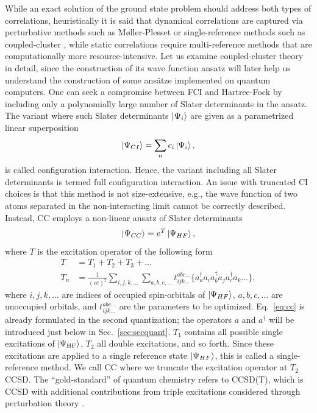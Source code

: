 \documentclass[../main.tex]{subfiles}
\begin{document}
While an exact solution of the ground state problem should address both types of correlations, heuristically it is said that dynamical correlations are captured via perturbative methods such as Møller-Plesset \cite{moller1934note} or single-reference methods such as coupled-cluster \cite{cizek1966on}, while static correlations require multi-reference methods that are computationally more resource-intensive. Let us examine coupled-cluster theory in detail, since the construction of its wave function ansatz will later help us understand the construction of some ansätze implemented on quantum computers. 
One can seek a compromise between FCI and Hartree-Fock by including only a polynomially large number of Slater determinants in the ansatz. The variant where such Slater determinants $\ket{\Psi_i}$ are given as a parametrized linear superposition
\begin{equation}
    \ket{\Psi_{CI}} = \sum_n c_i \ket{\Psi_i},
\end{equation} is called configuration interaction. Hence, the variant including all Slater determinants is termed full configuration interaction. An issue with truncated CI choices is that this method is not size-extensive, e.g., the wave function of two atoms separated in the non-interacting limit cannot be correctly described. Instead, \ac{CC} employs a non-linear ansatz of Slater determinants
\begin{equation}
    \ket{\Psi_{CC}} = e^T \ket{\Psi_{HF}},
\end{equation} where $T$  is the excitation operator of the following form \cite{taube2006new}
\begin{align}\label{eq:cc}
    T &= T_1 + T_2 + T_3 + \dots \\
    T_n &= \frac{1}{(n!)^2} \sum_{i,j,k,\dots}\sum_{a,b,c,\dots} t^{abc\dots}_{ijk\dots} \{a_a^\dagger a_i a_b^\dagger a_j a_c^\dagger a_k \dots \},
\end{align} where $i,j,k,\ldots$ are indices of occupied spin-orbitals of $\ket{\Psi_{HF}}$, $a,b,c,\ldots$ are unoccupied orbitals, and $t^{abc\dots}_{ijk\dots}$ are the parameters to be optimized. Eq.~\ref{eq:cc} is already formulated in the second quantization; the operators $a$ and $a^\dagger$ will be introduced just below in Sec.~\ref{sec:secquant}. $T_1$ contains all possible single excitations of $\ket{\Psi_\text{HF}}$, $T_2$ all double excitations, and so forth. Since these excitations are applied to a single reference state $\ket{\Psi_{HF}}$, this is called a single-reference method. We call \ac{CC} where we truncate the excitation operator at $T_2$ \ac{CCSD}. The ``gold-standard''  of quantum chemistry refers to CCSD(T), which is CCSD with additional contributions from triple excitations considered through perturbation theory \cite{bartlett2012coupled}. 
\end{document}
